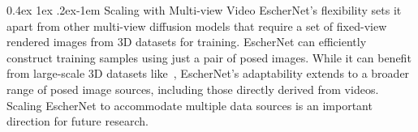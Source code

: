\documentclass[10pt,twocolumn,letterpaper]{article}
\makeatletter
\renewcommand{\paragraph}{%
  \@startsection{paragraph}{4}%
  {\z@}{0.4ex \@plus 1ex \@minus .2ex}{-1em}%
  {\normalfont\normalsize\bfseries}%
}
\makeatother
\begin{document}
\paragraph{Scaling with Multi-view Video}
EscherNet's flexibility sets it apart from other multi-view diffusion models \cite{liu2023syncdreamer,long2023wonder3d} that require a set of fixed-view rendered images from 3D datasets for training. EscherNet can efficiently construct training samples using just a pair of posed images. While it can benefit from large-scale 3D datasets like~\cite{deitke2023objaverse, deitke2023objaversexl}, EscherNet's adaptability extends to a broader range of posed image sources, including those directly derived from videos. Scaling EscherNet to accommodate multiple data sources is an important direction for future research.
\end{document}

